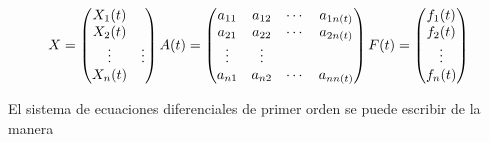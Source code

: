 \documentclass[11.5pt]{article}
\begin{document}
\begin{equation}
\left.
X=\begin{pmatrix}
 X_1(t)\\
 X_2(t)\\
 \vdots&\vdots\\
 X_n(t)\\
\end{pmatrix}
A(t)=\begin{pmatrix}
 a_{11} & a_{12}& \cdots& a_{1n(t)}\\ 
 a_{21} & a_{22}& \cdots& a_{2n(t)}\\  
 \vdots&\vdots\\
 a_{n1} & a_{n2}& \cdots& a_{nn(t)}\\ 
 
\end{pmatrix}\\
F(t)=\begin{pmatrix}
 f_1(t)\\
 f_2(t)\\
 \vdots\\
  f_n(t)\\
\end{pmatrix}\\
\right.
\end{equation}
\vspace{0.5cm}

El sistema de ecuaciones diferenciales de primer orden se puede escribir de la manera\\
\end{document}
